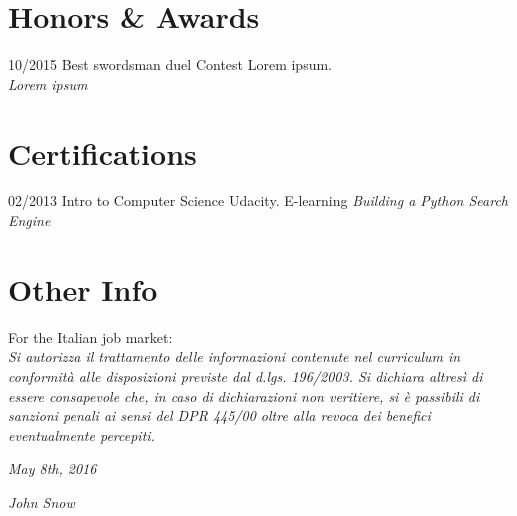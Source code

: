 \documentclass[]{friggeri-cv}
\begin{document}
\section{Honors \& Awards}
\begin{entrylist}
  \entry
    {10/2015}
    {Best swordsman duel}
    {Contest}
    {Lorem ipsum.\\
    \emph{Lorem ipsum}}
\end{entrylist}

\section{Certifications}
\begin{entrylist}
  \entry
    {02/2013}
    {Intro to Computer Science}
    {Udacity. E-learning}
    {\emph{Building a Python Search Engine}}
\end{entrylist}

\section{Other Info}
For the Italian job market:\\
\emph{Si autorizza il trattamento delle informazioni contenute nel curriculum in conformità alle disposizioni previste dal d.lgs. 196/2003. Si dichiara altresì di essere consapevole che, in caso di dichiarazioni non veritiere, si è passibili di sanzioni penali ai sensi del DPR 445/00 oltre alla revoca dei benefici eventualmente percepiti.}
\\
\begin{flushleft}
\emph{May 8th, 2016}
\end{flushleft}
\begin{flushright}
\emph{John Snow}
\end{flushright}
\end{document}
